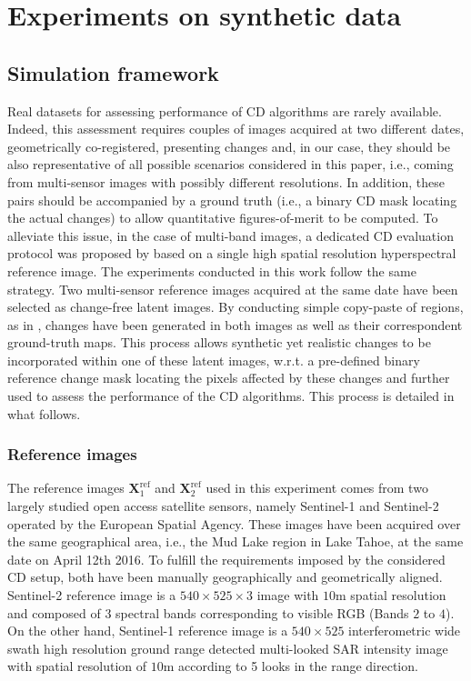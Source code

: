 \documentclass[review]{elsarticle}
\begin{document}
\section{Experiments on synthetic data}
\label{sec:experiments}

\subsection{Simulation framework}

Real datasets for assessing performance of CD algorithms are rarely available. Indeed, this assessment requires couples of images acquired at two different dates, geometrically co-registered, presenting changes and, in our case, they should be also representative of all possible scenarios considered in this paper, i.e., coming from multi-sensor images with possibly different resolutions. In addition, these pairs should be accompanied by a ground truth (i.e., a binary CD mask locating the actual changes) to allow quantitative figures-of-merit to be computed. To alleviate this issue, in the case of multi-band images, a dedicated CD evaluation protocol was proposed by \citet{ferraris_detecting_2017} based on a single high spatial resolution hyperspectral reference image. The experiments conducted in this work follow the same strategy. Two multi-sensor reference images acquired at the same date have been selected as change-free latent images. By conducting simple copy-paste of regions, as in \citet{ferraris_detecting_2017}, changes have been generated in both images as well as their correspondent ground-truth maps. This process allows synthetic yet realistic changes to be incorporated within one of these latent images, w.r.t. a pre-defined binary reference change mask locating the pixels affected by these changes and further used to assess the performance of the CD algorithms. This process is detailed in what follows.

\subsubsection{Reference images}
\label{subsubsec:sim_reference_images}

The reference images $\mathbf{X}^{\mathrm{ref}}_{1}$ and $\mathbf{X}^{\mathrm{ref}}_{2}$ used in this experiment comes from two largely studied open access satellite sensors, namely Sentinel-1 \citep{european_space_agency_sentinel-1_2017} and Sentinel-2 \citep{european_space_agency_sentinel-2_2017} operated by the European Spatial Agency. These images have been acquired over the same geographical area, i.e., the Mud Lake region in Lake Tahoe, at the same date on April 12th 2016. To fulfill the requirements imposed by the considered CD setup, both have been manually geographically and geometrically aligned. Sentinel-2 reference image is a $540 \times 525 \times 3$ image with $10$m spatial resolution and composed of $3$ spectral bands corresponding to visible RGB (Bands $2$ to $4$). On the other hand, Sentinel-1 reference image is a $540 \times 525$ interferometric wide swath high resolution ground range detected multi-looked SAR intensity image with spatial resolution of $10$m according to 5 looks in the range direction.
\end{document}

